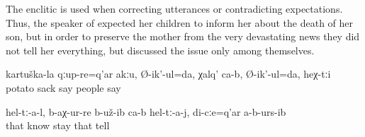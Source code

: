 The enclitic is used when correcting utterances  or contradicting expectations. Thus, the speaker of  expected her children to inform her about the death of her son, but in order to preserve the mother from the very devastating news they did not tell her everything, but discussed the issue only among themselves.
%
\begin{exe}
	\ex	\label{ex:These are not potato sacks, I say, they are people minor}
	\gll	kartuška-la	qːup-re=q'ar	akːu,	Ø-ik'-ul=da,	χalq'	ca-b,	Ø-ik'-ul=da,	heχ-tːi\\
		potato	sack		say	people		say	\\
	\glt	{}

	\ex	\label{ex:Apparently they knew it and they did not tell it to me minor}
	\gll	hel-tː-a-l,	b-aχ-ur-re	b-už-ib	ca-b	hel-tː-a-j,	di-cːe=q'ar	a-b-urs-ib\\
		that	know	stay		that		tell\\
	\glt	{}
\end{exe}

